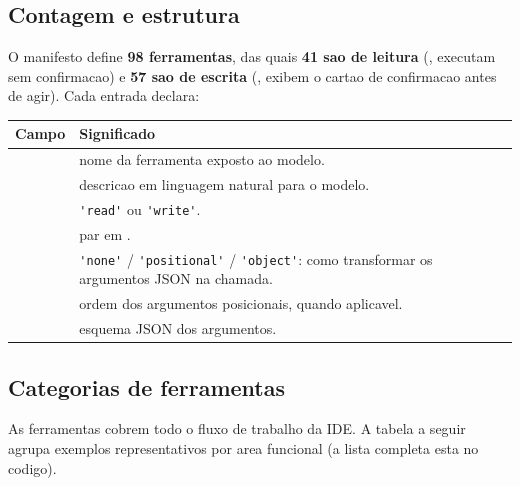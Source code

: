 \subsection{Contagem e estrutura}

O manifesto define \textbf{98 ferramentas}, das quais \textbf{41 sao de leitura}
(, executam sem confirmacao) e \textbf{57 sao de escrita}
(, exibem o cartao de confirmacao antes de agir). Cada
entrada declara:

\begin{tabularx}{\linewidth}{l Y}
\toprule
\textbf{Campo} & \textbf{Significado} \\
\midrule
{}        & nome da ferramenta exposto ao modelo. \\
 & descricao em linguagem natural para o modelo. \\
      & \lstinline|'read'| ou \lstinline|'write'|. \\
         & par  em . \\
    & \lstinline|'none'| / \lstinline|'positional'| / \lstinline|'object'|: como transformar os argumentos JSON na chamada. \\
    & ordem dos argumentos posicionais, quando aplicavel. \\
 & esquema JSON dos argumentos. \\
\bottomrule
\end{tabularx}

\subsection{Categorias de ferramentas}

As ferramentas cobrem todo o fluxo de trabalho da IDE. A tabela a seguir agrupa
exemplos representativos por area funcional (a lista completa esta no codigo).

